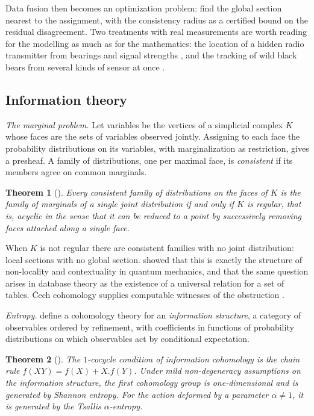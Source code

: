 \documentclass[11pt,a4paper,oneside]{scrartcl}
\theoremstyle{guideplain}
\newtheorem{theorem}{Theorem}[section]
\theoremstyle{guidedef}
\begin{document}
Data fusion then becomes an optimization problem: find the global section nearest to the assignment,
with the consistency radius as a certified bound on the residual disagreement. Two treatments with
real measurements are worth reading for the modelling as much as for the mathematics: the location of
a hidden radio transmitter from bearings and signal strengths \autocite{robinson2019}, and the
tracking of wild black bears from several kinds of sensor at once \autocite{joslyn2020}.

\subsection{Information theory}\label{sec:info}

\emph{The marginal problem.} Let variables be the vertices of a simplicial complex $K$ whose faces
are the sets of variables observed jointly. Assigning to each face the probability distributions on
its variables, with marginalization as restriction, gives a presheaf. A family of distributions, one
per maximal face, is \emph{consistent} if its members agree on common marginals.

\begin{theorem}[\cite{vorobev1962}]\label{thm:vorobev}
  Every consistent family of distributions on the faces of $K$ is the family of marginals of a single
  joint distribution if and only if $K$ is regular, that is, acyclic in the sense that it can be
  reduced to a point by successively removing faces attached along a single face.
\end{theorem}

When $K$ is not regular there are consistent families with no joint distribution: local sections
with no global section. \textcite{abramsky2011} showed that this is exactly the structure of
non-locality and contextuality in quantum mechanics, and \textcite{abramsky2013} that the same
question arises in database theory as the existence of a universal relation for a set of tables.
Čech cohomology supplies computable witnesses of the obstruction \autocite{abramsky2015}.

\emph{Entropy.} \textcite{baudot2015} define a cohomology theory for an \emph{information
structure}, a category of observables ordered by refinement, with coefficients in functions of
probability distributions on which observables act by conditional expectation.

\begin{theorem}[\cite{baudot2015,vigneaux2020}]
  The $1$-cocycle condition of information cohomology is the chain rule
  $f(XY)=f(X)+X.f(Y)$. Under mild non-degeneracy assumptions on the information structure, the first
  cohomology group is one-dimensional and is generated by Shannon entropy. For the action deformed by
  a parameter $\alpha\neq1$, it is generated by the Tsallis $\alpha$-entropy.
\end{theorem}
\end{document}

